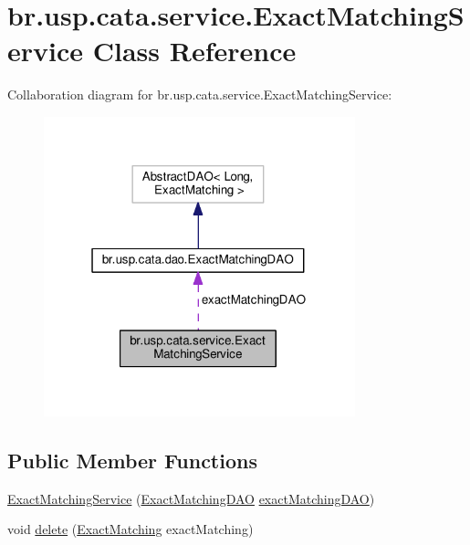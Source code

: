 \hypertarget{classbr_1_1usp_1_1cata_1_1service_1_1_exact_matching_service}{\section{br.\+usp.\+cata.\+service.\+Exact\+Matching\+Service Class Reference}
\label{classbr_1_1usp_1_1cata_1_1service_1_1_exact_matching_service}
}


Collaboration diagram for br.\+usp.\+cata.\+service.\+Exact\+Matching\+Service\+:\nopagebreak
\begin{figure}[H]
\begin{center}
\leavevmode
\includegraphics[width=256pt]{classbr_1_1usp_1_1cata_1_1service_1_1_exact_matching_service__coll__graph}
\end{center}
\end{figure}
\subsection*{Public Member Functions}
\begin{DoxyCompactItemize}
\item 
\hyperlink{classbr_1_1usp_1_1cata_1_1service_1_1_exact_matching_service_ad2b3d3528d8db42c5d8e54ea207b8765}{Exact\+Matching\+Service} (\hyperlink{classbr_1_1usp_1_1cata_1_1dao_1_1_exact_matching_d_a_o}{Exact\+Matching\+D\+A\+O} \hyperlink{classbr_1_1usp_1_1cata_1_1service_1_1_exact_matching_service_a355ae4d45ad5f556da749103e32ef2a0}{exact\+Matching\+D\+A\+O})
\item 
void \hyperlink{classbr_1_1usp_1_1cata_1_1service_1_1_exact_matching_service_a3d73b8362469aff126a8274fbcb81950}{delete} (\hyperlink{classbr_1_1usp_1_1cata_1_1model_1_1_exact_matching}{Exact\+Matching} exact\+Matching)
\end{DoxyCompactItemize}
